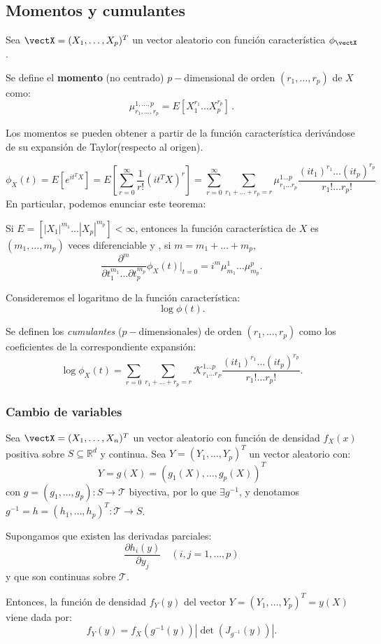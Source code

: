 \subsection{Momentos y cumulantes}

Sea $\vectX= (X_1,\dots,X_p)^T$ un vector aleatorio con función característica $\phi_{\vectX}$.
\begin{ndef}
  Se define el \textbf{momento} (no centrado) $p-$dimensional de orden $(r_1, \dots, r_p)$ de $X$ como:
  \[
\mu_{r_1,\dots,r_p}^{1,\dots,p} = E \left[ X_1^{r_1} \dots X_p^{r_p}\right]\,.
  \]
\end{ndef}

Los momentos se pueden obtener a partir de la función característica derivándose de su expansión de Taylor(respecto al origen).

\[
\phi_X(t) = E\left[e^{it^T X}\right] = E\left[\sum_{r=0}^\infty \frac{1}{r!}(i t^T X)^r\right] = \sum_{r= 0}^\infty \sum _{r_1+\dots + r_p = r} \mu_{r_1 \dots r_p}^{1 \dots p} \frac{(it_1)^{r_1} \dots (it_p)^{r_p}}{r_1 ! \dots r_p !}
\]
En particular, podemos enunciar este teorema:
\begin{nth}
  Si $E=\left[|X_1|^{m_1} \dots |X_p|^{m_p}\right] < \infty$, entonces la función característica de $X$ es $(m_1, \dots, m_p)$ veces diferenciable y , si $m = m_1 + \dots + m_p$,
  \[
\frac{\partial ^m}{\partial t_1^{m_1} \dots \partial t_p^{m_p}} \phi_X(t)| _{t = 0} = i^m \mu_{m_1}^1 \dots \mu_{m_p}^p
  .\]
\end{nth}

Consideremos el logaritmo de la función característica:
\[
\log \phi(t).
\]
\begin{ndef}
  Se definen los \emph{cumulantes} ($p-$dimensionales) de orden $(r_1 , \dots, r_p)$ como los coeficientes de la correspondiente expansión:
  \[
  \log \phi_X(t) =  \sum_{r= 0} \sum_{r_1+\dots + r_p = r} \mathcal K_{r_1 \dots r_P}^{1\dots p} \frac{(it_1)^{r_1} \dots (it_p)^{r_p}}{r_1 ! \dots r_p !}
  .\]
\end{ndef}


\subsubsection{Cambio de variables}

\begin{nth} \label{cambiovariablealeatoria}
  Sea $\vectX = (X_1,\dots,X_n)^T$ un vector aleatorio con función de densidad $f_X(x)$ positiva sobre $S \subseteq \mathbb R^d$ y continua. Sea $Y = (Y_1,\dots,Y_p)^T$ un vector aleatorio con:
  \[
  Y = g(X) = (g_1(X),\dots ,g_p(X))^T
  \]
  con $g = (g_1,\dots,g_p): S \to \mathcal T$ biyectiva, por lo que $\exists g^{-1}$, y denotamos $g^{-1} = h = (h_1,\dots, h_p)^T : \mathcal T \to S$.

  Supongamos que existen las derivadas parciales:
  \[
    \frac{\partial h_i(y)}{\partial y_j} \quad (i,j = 1,\dots,p)
  \]
  y que son continuas sobre $\mathcal T$.

  Entonces, la función de densidad $f_Y(y)$ del vector $Y=(Y_1,\dots,Y_p)^T = y(X)$ viene dada por:
  \[
  f_Y(y) = f_X(g^{-1}(y))\left|\det(J_{g^{-1}}(y))\right|
  .\]
\end{nth}

